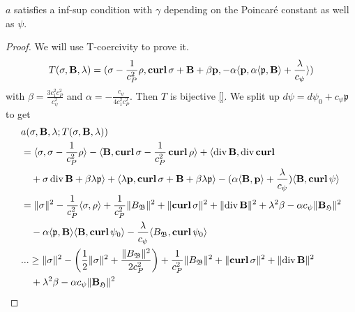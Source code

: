 \documentclass[../master_thesis.tex]{subfiles}
\begin{document}
\begin{theorem}
    $a$ satisfies a inf-sup condition with $\gamma$ depending on the Poincaré constant 
    as well as $\psi$.
\end{theorem}
\begin{proof}
    We will use T-coercivity to prove it. 
    \begin{align*}
        T(\sigma, \mathbf{B},\lambda)
        = (\sigma - \frac{1}{c_P^2}\rho, \veccurl \sigma + \mathbf{B} + \beta \mathbf{p},
            -\alpha \langle \mathbf{p}, \alpha \langle \mathfrak{p}, \mathbf{B} \rangle  + \frac{\lambda}{c_\psi} \rangle)
    \end{align*}
    with $\beta = \frac{3 c_1^2 c_P^2}{c_\psi^2}$ and $\alpha = -\frac{c_\psi}{4 c_1^2 c_P^2}$.
    Then $T$ is bijective \ref{}. We split up $d\psi = d\psi_0 + c_\psi \mathfrak{p}$ to get 
    \begin{align*}
        &a(\sigma, \mathbf{B},\lambda;T(\sigma, \mathbf{B},\lambda))
        \\ &=\langle \sigma, \sigma - \frac{1}{c_P^2} \rho \rangle 
            - \langle \mathbf{B}, \veccurl \sigma - \frac{1}{c_P^2}\veccurl \rho \rangle
            + \langle \diver \mathbf{B}, \diver \veccurl 
        \\ &\quad + \sigma \diver \mathbf{B} + \beta \lambda \mathfrak{p}\rangle
            + \langle \lambda \mathbf{p}, \veccurl \sigma + \mathbf{B} + \beta \lambda \mathfrak{p}\rangle
            - (\alpha \langle \mathbf{B}, \mathbf{p} \rangle + \frac{\lambda}{c_\psi})
            \langle \mathbf{B} , \veccurl\psi \rangle
        \\ &= \lVert \sigma \rVert^2 - \frac{1}{c_P^2} \langle \sigma , \rho \rangle 
            + \frac{1}{c_P^2} \lVert B_\mathfrak{B} \rVert^2 + \lVert  \veccurl \sigma \rVert^2
            + \lVert \diver \mathbf{B} \rVert ^2 + \lambda ^2 \beta - \alpha c_\psi \lVert \mathbf{B}_\mathfrak{H} \rVert^2
        \\ &\quad- \alpha \langle \mathfrak{p}, \mathbf{B} \rangle \langle \mathbf{B}, \veccurl \psi_0 \rangle
            - \frac{\lambda}{c_\psi} \langle B_\mathfrak{B} , \veccurl \psi_0 \rangle
        \\ &...\geq \lVert \sigma \rVert^2 - 
            \left( \frac{1}{2} \lVert \sigma \rVert^2 
            + \frac{\lVert B_\mathfrak{B} \rVert^2}{2 c_P^2}  \right)
            + \frac{1}{c_P^2} \lVert B_\mathfrak{B} \rVert^2
            + \lVert  \veccurl \sigma \rVert^2 + \lVert \diver \mathbf{B} \rVert ^2
        \\ &\quad+ \lambda ^2 \beta - \alpha c_\psi \lVert \mathbf{B}_\mathfrak{H} \rVert^2

\end{align*}
\end{proof}
\end{document}
